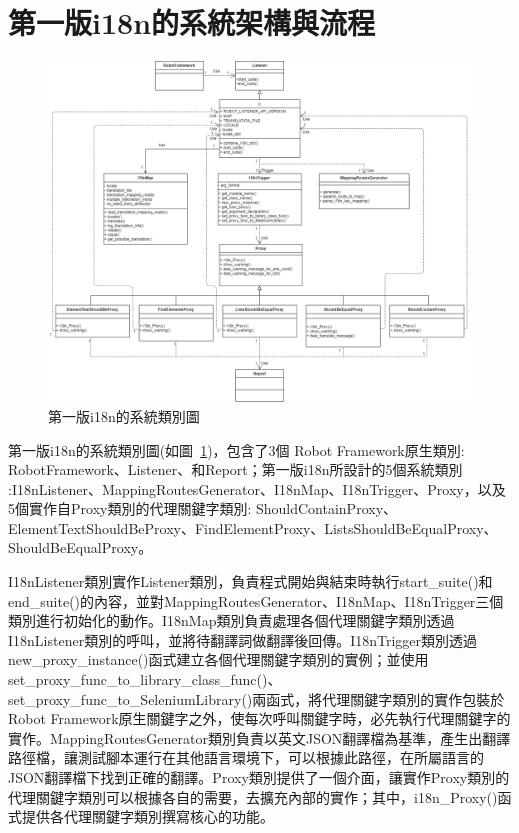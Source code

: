 \section{第一版i18n的系統架構與流程}
\begin{figure}[H]
    \includegraphics[width= 1.1\textwidth]{../UML/i18n class diagram-第一版i18n class diagram.png}
    \caption{第一版i18n的系統類別圖}
    \label{1stI18nClassDiagram}
\end{figure}
第一版i18n的系統類別圖(如圖~\ref{1stI18nClassDiagram})，包含了3個 Robot Framework原生類別: RobotFramework、Listener、和Report；第一版i18n所設計的5個系統類別 :I18nListener、MappingRoutesGenerator、I18nMap、I18nTrigger、Proxy，以及5個實作自Proxy\cite{proxy}類別的代理關鍵字類別: ShouldContainProxy、ElementTextShouldBeProxy、FindElementProxy、ListsShouldBeEqualProxy、ShouldBeEqualProxy。\cite{i18n}

I18nListener類別實作Listener類別，負責程式開始與結束時執行start\_suite()和end\_suite()的內容，並對MappingRoutesGenerator、I18nMap、I18nTrigger三個類別進行初始化的動作。I18nMap類別負責處理各個代理關鍵字類別透過I18nListener類別的呼叫，並將待翻譯詞做翻譯後回傳。I18nTrigger類別透過new\_proxy\_instance()函式建立各個代理關鍵字類別的實例；並使用set\_proxy\_func\_to\_library\_class\_func()、set\_proxy\_func\_to\_SeleniumLibrary()兩函式，將代理關鍵字類別的實作包裝於Robot Framework原生關鍵字之外，使每次呼叫關鍵字時，必先執行代理關鍵字的實作。MappingRoutesGenerator類別負責以英文JSON翻譯檔為基準，產生出翻譯路徑檔，讓測試腳本運行在其他語言環境下，可以根據此路徑，在所屬語言的JSON翻譯檔下找到正確的翻譯。Proxy類別提供了一個介面，讓實作Proxy類別的代理關鍵字類別可以根據各自的需要，去擴充內部的實作；其中，i18n\_Proxy()函式提供各代理關鍵字類別撰寫核心的功能。

